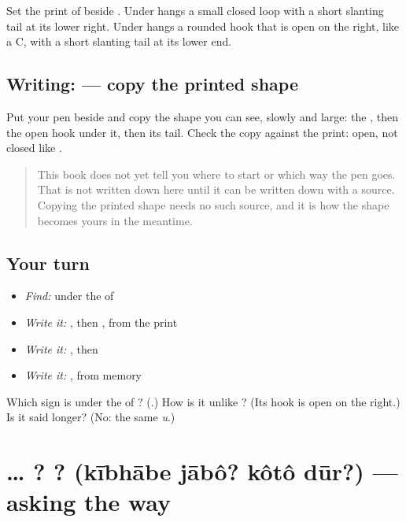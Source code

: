 Set the print of \textbf{} beside \textbf{}. Under \textbf{} hangs a small closed loop with a short slanting tail at its lower right. Under \textbf{} hangs a rounded hook that is open on the right, like a C, with a short slanting tail at its lower end.

\subsection*{Writing:  — copy the printed shape}
Put your pen beside \textbf{} and copy the shape you can see, slowly and large: the \textbf{}, then the open hook under it, then its tail. Check the copy against the print: open, not closed like \textbf{}.

\begin{quote}
This book does not yet tell you where to start  or which way the pen goes. That is not written down here until it can be written down with a source. Copying the printed shape needs no such source, and it is how the shape becomes yours in the meantime.
\end{quote}

\subsection*{Your turn}
\begin{itemize}
\raggedright
  \item \emph{Find:}  under the  of \textbf{}
  \item \emph{Write it:} \textbf{}, then \textbf{}, from the print
  \item \emph{Write it:} \textbf{}, then \textbf{}
  \item \emph{Write it:} \textbf{}, from memory
\end{itemize}

\begin{tcolorbox}[breakable,colback=teal!4,colframe=teal!35!black,title={Before you move on}]
Which sign is under the \textbf{} of \textbf{}? (\textbf{}.) How is it unlike \textbf{}? (Its hook is open on the right.) Is it said longer? (No: the same \emph{u}.)
\end{tcolorbox}
\section[\texorpdfstring{… \bn{কীভাবে} \bn{যাব}? \bn{কত} … (… kībhābe jābô? …)}{… কীভাবে যাব? কত … (… kībhābe jābô? …)}]{…  ?  ? (kībhābe jābô? kôtô dūr?) — asking the way}

